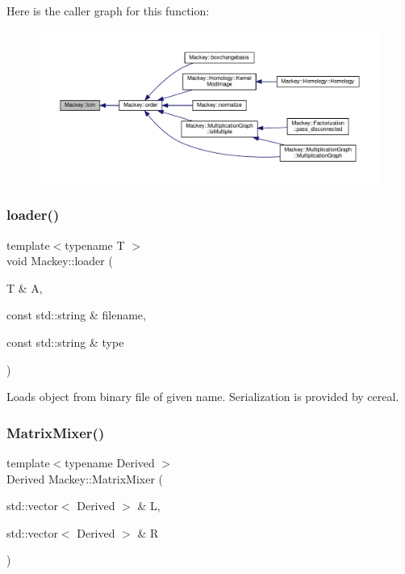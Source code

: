 Here is the caller graph for this function\+:\nopagebreak
\begin{figure}[H]
\begin{center}
\leavevmode
\includegraphics[width=350pt]{namespaceMackey_a5d8ae76ffb9440e27bfca124d26ee1b2_icgraph}
\end{center}
\end{figure}
\mbox{\label{namespaceMackey_a735958355cdca12e0d312b7e604f28bc}} 
\subsubsection{\texorpdfstring{loader()}{loader()}}
{\footnotesize\ttfamily template$<$typename T $>$ \\
void Mackey\+::loader (\begin{DoxyParamCaption}\item[{T \&}]{A,  }\item[{const std\+::string \&}]{filename,  }\item[{const std\+::string \&}]{type }\end{DoxyParamCaption})}



Loads object from binary file of given name. Serialization is provided by cereal. 

\mbox{\label{namespaceMackey_a993f40280c4b6eae358e8c1bb4daa290}} 
\subsubsection{\texorpdfstring{Matrix\+Mixer()}{MatrixMixer()}}
{\footnotesize\ttfamily template$<$typename Derived $>$ \\
Derived Mackey\+::\+Matrix\+Mixer (\begin{DoxyParamCaption}\item[{std\+::vector$<$ Derived $>$ \&}]{L,  }\item[{std\+::vector$<$ Derived $>$ \&}]{R }\end{DoxyParamCaption})}



